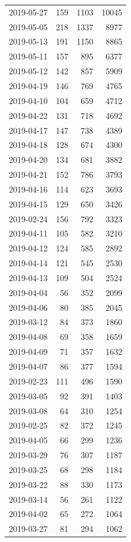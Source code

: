 \begin{tabular}{lrrr}
2019-05-27 & 159 & 1103 & 10045 \\
2019-05-05 & 218 & 1337 & 8977 \\
2019-05-13 & 191 & 1150 & 8865 \\
2019-05-11 & 157 & 895 & 6377 \\
2019-05-12 & 142 & 857 & 5909 \\
2019-04-19 & 146 & 769 & 4765 \\
2019-04-10 & 104 & 659 & 4712 \\
2019-04-22 & 131 & 718 & 4692 \\
2019-04-17 & 147 & 738 & 4389 \\
2019-04-18 & 128 & 674 & 4300 \\
2019-04-20 & 134 & 681 & 3882 \\
2019-04-21 & 152 & 786 & 3793 \\
2019-04-16 & 114 & 623 & 3693 \\
2019-04-15 & 129 & 650 & 3426 \\
2019-02-24 & 156 & 792 & 3323 \\
2019-04-11 & 105 & 582 & 3210 \\
2019-04-12 & 124 & 585 & 2892 \\
2019-04-14 & 121 & 545 & 2530 \\
2019-04-13 & 109 & 504 & 2524 \\
2019-04-04 & 56 & 352 & 2099 \\
2019-04-06 & 80 & 385 & 2045 \\
2019-03-12 & 84 & 373 & 1860 \\
2019-04-08 & 69 & 358 & 1659 \\
2019-04-09 & 71 & 357 & 1632 \\
2019-04-07 & 86 & 377 & 1594 \\
2019-02-23 & 111 & 496 & 1590 \\
2019-03-05 & 92 & 391 & 1403 \\
2019-03-08 & 64 & 310 & 1254 \\
2019-02-25 & 82 & 372 & 1245 \\
2019-04-05 & 66 & 299 & 1236 \\
2019-03-29 & 76 & 307 & 1187 \\
2019-03-25 & 68 & 298 & 1184 \\
2019-03-22 & 88 & 330 & 1173 \\
2019-03-14 & 56 & 261 & 1122 \\
2019-04-02 & 65 & 272 & 1064 \\
2019-03-27 & 81 & 294 & 1062 \\

\end{tabular}
